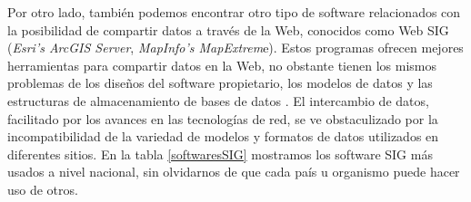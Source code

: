 Por otro lado, también podemos encontrar otro tipo de software relacionados con la posibilidad de compartir datos a través de la Web, conocidos como Web SIG (\textit{Esri’s ArcGIS Server}, \textit{MapInfo’s MapExtrem}e). Estos programas ofrecen mejores herramientas para compartir datos en la Web, no obstante tienen los mismos problemas de los diseños del software propietario, los modelos de datos y las estructuras de almacenamiento de bases de datos \cite{libro-gis}. El intercambio de datos, facilitado por los avances en las tecnologías de red, se ve obstaculizado por la incompatibilidad de la variedad de modelos y formatos de datos utilizados en diferentes sitios. En la tabla \ref{softwaresSIG} mostramos los software SIG más usados a nivel nacional, sin olvidarnos de que cada país u organismo puede hacer uso de otros.




